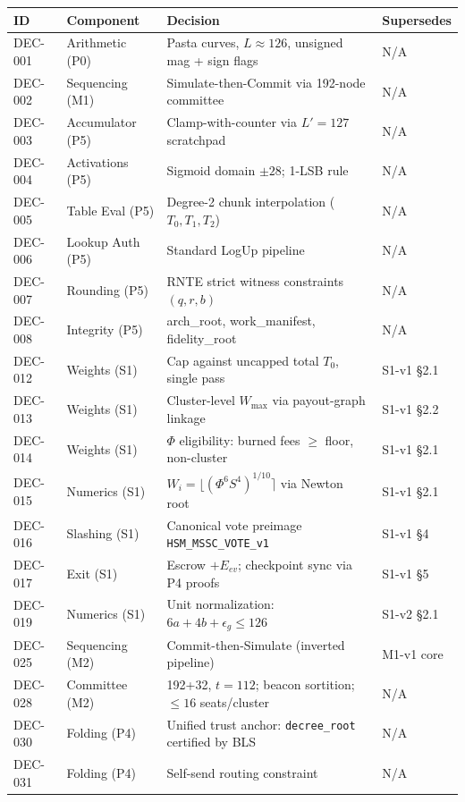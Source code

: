 \documentclass[11pt, a4paper]{article}
\begin{document}
\begin{center}
\begin{longtable}{l|l|l|l}
\textbf{ID} & \textbf{Component} & \textbf{Decision} & \textbf{Supersedes} \\
\hline
DEC-001 & Arithmetic (P0) & Pasta curves, $L \approx 126$, unsigned mag + sign flags & N/A \\
DEC-002 & Sequencing (M1) & Simulate-then-Commit via 192-node committee & N/A \\
DEC-003 & Accumulator (P5) & Clamp-with-counter via $L'=127$ scratchpad & N/A \\
DEC-004 & Activations (P5) & Sigmoid domain $\pm 28$; 1-LSB rule & N/A \\
DEC-005 & Table Eval (P5) & Degree-2 chunk interpolation ($T_0, T_1, T_2$) & N/A \\
DEC-006 & Lookup Auth (P5) & Standard LogUp pipeline & N/A \\
DEC-007 & Rounding (P5) & RNTE strict witness constraints $(q, r, b)$ & N/A \\
DEC-008 & Integrity (P5) & arch\_root, work\_manifest, fidelity\_root & N/A \\
DEC-012 & Weights (S1) & Cap against uncapped total $T_0$, single pass & S1-v1 §2.1 \\
DEC-013 & Weights (S1) & Cluster-level $W_{\max}$ via payout-graph linkage & S1-v1 §2.2 \\
DEC-014 & Weights (S1) & $\Phi$ eligibility: burned fees $\ge$ floor, non-cluster & S1-v1 §2.1 \\
DEC-015 & Numerics (S1) & $W_i = \lfloor(\Phi^6 S^4)^{1/10}\rceil$ via Newton root & S1-v1 §2.1 \\
DEC-016 & Slashing (S1) & Canonical vote preimage \texttt{HSM\_MSSC\_VOTE\_v1} & S1-v1 §4 \\
DEC-017 & Exit (S1) & Escrow $+ E_{ev}$; checkpoint sync via P4 proofs & S1-v1 §5 \\
DEC-019 & Numerics (S1) & Unit normalization: $6a + 4b + \epsilon_g \le 126$ & S1-v2 §2.1 \\
DEC-025 & Sequencing (M2) & Commit-then-Simulate (inverted pipeline) & M1-v1 core \\
DEC-028 & Committee (M2) & 192+32, $t = 112$; beacon sortition; $\le 16$ seats/cluster & N/A \\
DEC-030 & Folding (P4) & Unified trust anchor: \texttt{decree\_root} certified by BLS & N/A \\
DEC-031 & Folding (P4) & Self-send routing constraint & N/A \\

\end{longtable}
\end{center}
\end{document}
